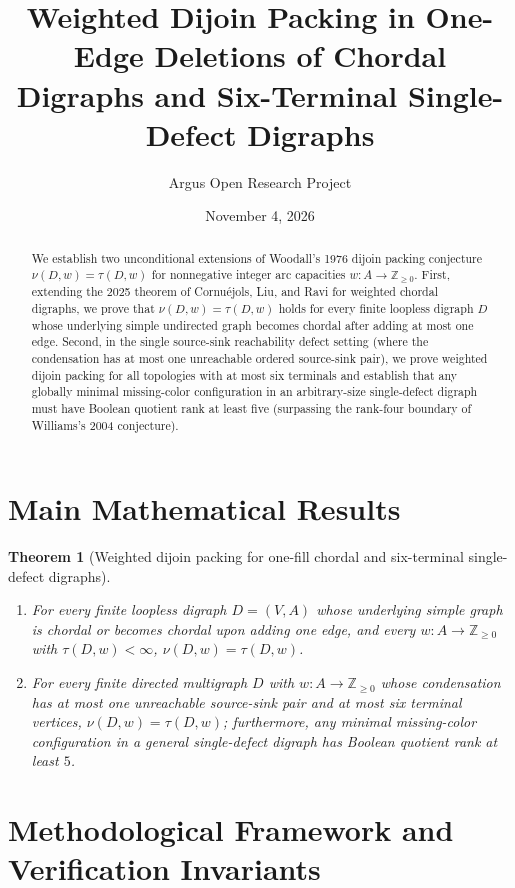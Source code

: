 \documentclass[10pt,reqno]{amsart}
\title[Weighted Dijoin Packing in One-Fill Chordal and Single-Defect Digraphs]
{Weighted Dijoin Packing in One-Edge Deletions of Chordal Digraphs and Six-Terminal Single-Defect Digraphs}
\author{Argus Open Research Project}
\date{November 4, 2026}
\newtheorem{theorem}{Theorem}[section]
\theoremstyle{definition}
\begin{document}
\begin{abstract}
We establish two unconditional extensions of Woodall's 1976 dijoin packing conjecture $\nu(D,w) = \tau(D,w)$ for nonnegative integer arc capacities $w \colon A \to \mathbb{Z}_{\ge 0}$. First, extending the 2025 theorem of Cornu\'ejols, Liu, and Ravi for weighted chordal digraphs, we prove that $\nu(D,w) = \tau(D,w)$ holds for every finite loopless digraph $D$ whose underlying simple undirected graph becomes chordal after adding at most one edge. Second, in the single source-sink reachability defect setting (where the condensation has at most one unreachable ordered source-sink pair), we prove weighted dijoin packing for all topologies with at most six terminals and establish that any globally minimal missing-color configuration in an arbitrary-size single-defect digraph must have Boolean quotient rank at least five (surpassing the rank-four boundary of Williams's 2004 conjecture).
\end{abstract}
\maketitle

\section{Main Mathematical Results}
\begin{theorem}[Weighted dijoin packing for one-fill chordal and six-terminal single-defect digraphs]
\begin{enumerate}[label=\textup{(\arabic*)}]
  \item For every finite loopless digraph $D=(V,A)$ whose underlying simple graph is chordal or becomes chordal upon adding one edge, and every $w \colon A \to \mathbb{Z}_{\ge 0}$ with $\tau(D,w) < \infty$, $\nu(D,w) = \tau(D,w)$.
  \item For every finite directed multigraph $D$ with $w \colon A \to \mathbb{Z}_{\ge 0}$ whose condensation has at most one unreachable source-sink pair and at most six terminal vertices, $\nu(D,w) = \tau(D,w)$; furthermore, any minimal missing-color configuration in a general single-defect digraph has Boolean quotient rank at least $5$.
\end{enumerate}
\end{theorem}

\section{Methodological Framework and Verification Invariants}
\end{document}
